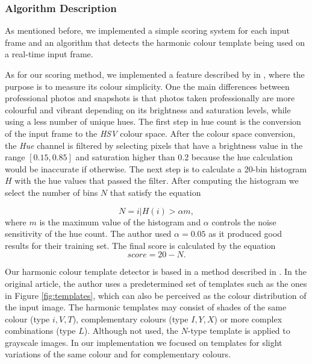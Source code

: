 \subsubsection{Algorithm Description}
As mentioned before, we implemented a simple scoring system for each input frame and an algorithm that detects the harmonic colour template being used on a real-time input frame.

As for our scoring method, we implemented a feature described by \citeauthor{ke2006design} in \cite{ke2006design}, where the purpose is to measure its colour simplicity. One the main differences between professional photos and snapshots is that photos taken professionally are more colourful and vibrant depending on its brightness and saturation levels, while using a less number of unique hues. The first step in hue count is the conversion of the input frame to the \emph{HSV} colour space. After the colour space conversion, the \emph{Hue} channel is filtered by selecting pixels that have a brightness value in the range $[0.15,0.85]$ and saturation higher than 0.2 because the hue calculation would be inaccurate if otherwise. The next step is to calculate a 20-bin histogram $H$ with the hue values that passed the filter. After computing the histogram we select the number of bins $N$ that satisfy the equation

\begin{equation}
N = {i | H(i) > \alpha m},
\end{equation}
where $m$ is the maximum value of the histogram and $\alpha$ controls the noise sensitivity of the hue count. The author used $\alpha = 0.05$ as it produced good results for their training set. The final score is calculated by the equation
\begin{equation}
score = 20 - N.
\end{equation}

Our harmonic colour template detector is based in a method described in \cite{cohen2006color}. In the original article, the author uses a predetermined set of templates such as the ones in Figure \ref{fig:templates}, which can also be perceived as the colour distribution of the input image. The harmonic templates may consist of shades of the same colour (type $i, V, T$), complementary colours (type $I, Y, X$) or more complex combinations (type $L$). Although not used, the $N$-type template is applied to grayscale images. In our implementation we focused on templates for slight variations of the same colour and for complementary colours.

